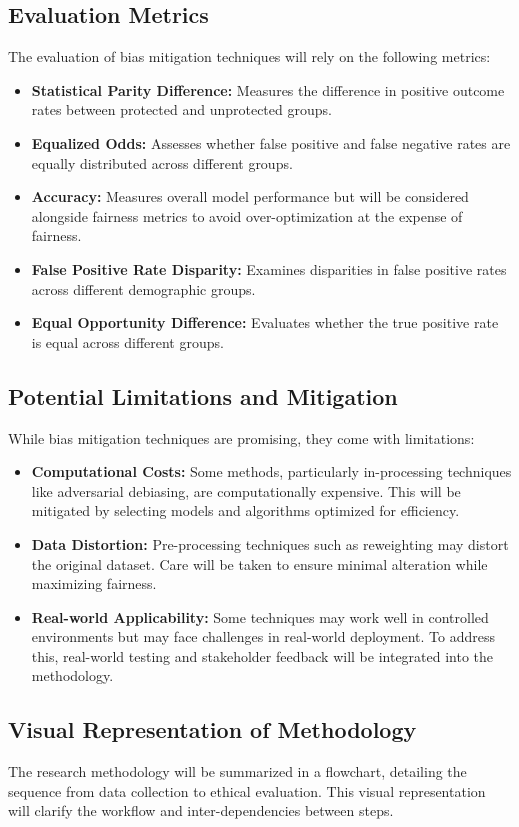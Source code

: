 \documentclass[a4paper, 12pt]{article}
\begin{document}
\subsection{Evaluation Metrics}
The evaluation of bias mitigation techniques will rely on the following metrics:
\begin{itemize}
    \item \textbf{Statistical Parity Difference:} Measures the difference in positive outcome rates between protected and unprotected groups.
    \item \textbf{Equalized Odds:} Assesses whether false positive and false negative rates are equally distributed across different groups.
    \item \textbf{Accuracy:} Measures overall model performance but will be considered alongside fairness metrics to avoid over-optimization at the expense of fairness.
    \item \textbf{False Positive Rate Disparity:} Examines disparities in false positive rates across different demographic groups.
    \item \textbf{Equal Opportunity Difference:} Evaluates whether the true positive rate is equal across different groups.
\end{itemize}

\subsection{Potential Limitations and Mitigation}
While bias mitigation techniques are promising, they come with limitations:
\begin{itemize}
    \item \textbf{Computational Costs:} Some methods, particularly in-processing techniques like adversarial debiasing, are computationally expensive. This will be mitigated by selecting models and algorithms optimized for efficiency.
    \item \textbf{Data Distortion:} Pre-processing techniques such as reweighting may distort the original dataset. Care will be taken to ensure minimal alteration while maximizing fairness.
    \item \textbf{Real-world Applicability:} Some techniques may work well in controlled environments but may face challenges in real-world deployment. To address this, real-world testing and stakeholder feedback will be integrated into the methodology.
\end{itemize}

\subsection{Visual Representation of Methodology}
The research methodology will be summarized in a flowchart, detailing the sequence from data collection to ethical evaluation. This visual representation will clarify the workflow and inter-dependencies between steps.
\end{document}
